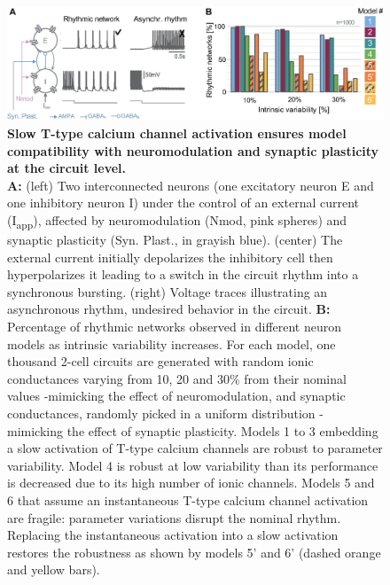 \begin{figure}[h!]
\centering
\includegraphics[scale=0.95]{fig/Plos/Fig2}
\caption{{ \bf Slow T-type calcium channel activation ensures model compatibility with neuromodulation and synaptic plasticity at the circuit level. } \\ \textbf{A:} (left) Two interconnected neurons (one excitatory neuron E and one inhibitory neuron I) under the control of an external current (I\textsubscript{app}), affected by neuromodulation (Nmod, pink spheres) and synaptic plasticity (Syn. Plast., in grayish blue).  (center) The external current initially depolarizes the inhibitory cell then hyperpolarizes it leading to a switch in the circuit rhythm into a synchronous bursting. (right) Voltage traces illustrating an asynchronous rhythm, undesired behavior in the circuit. 
\textbf{B:} Percentage of rhythmic networks observed in different neuron models as intrinsic variability increases. For each model, one thousand 2-cell circuits are generated with random ionic conductances varying from 10, 20 and 30$\%$ from their nominal values -mimicking the effect of neuromodulation, and synaptic conductances, randomly picked in a uniform distribution - mimicking the effect of synaptic plasticity.  Models 1 to 3 embedding a slow activation of T-type calcium channels are robust to parameter variability. Model 4 is robust at low variability than its performance is decreased due to its high number of ionic channels. Models 5 and 6 that assume an instantaneous T-type calcium channel activation are fragile: parameter variations disrupt the nominal rhythm.   Replacing the instantaneous activation into a slow activation restores the robustness as shown by models 5' and 6' (dashed orange and yellow bars).}
\label{fig:2}
\end{figure}


